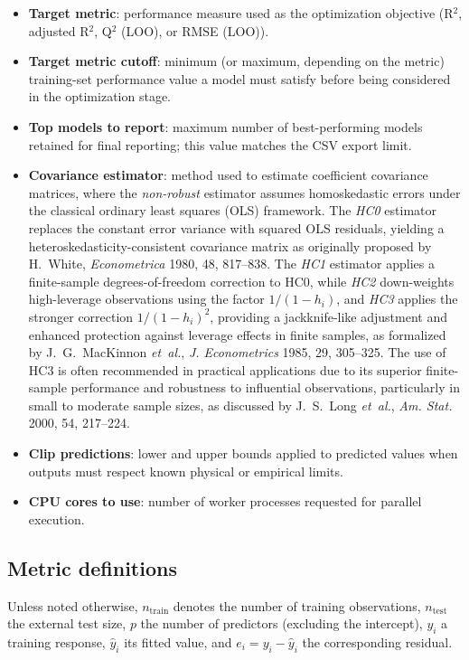 \documentclass[11pt,a4paper]{article}
\begin{document}
\begin{itemize}
  \item \textbf{Target metric}: performance measure used as the optimization objective (R$^2$, adjusted R$^2$, Q$^2$ (LOO), or RMSE (LOO)).
  \item \textbf{Target metric cutoff}: minimum (or maximum, depending on the metric) training-set performance value a model must satisfy before being considered in the optimization stage.
  \item \textbf{Top models to report}: maximum number of best-performing models retained for final reporting; this value matches the CSV export limit.
  \item \textbf{Covariance estimator}: method used to estimate coefficient covariance matrices, where the \emph{non-robust} estimator assumes homoskedastic errors under the classical ordinary least squares (OLS) framework. The \emph{HC0} estimator replaces the constant error variance with squared OLS residuals, yielding a heteroskedasticity-consistent covariance matrix as originally proposed by H.~White, \emph{Econometrica} 1980, 48, 817--838. The \emph{HC1} estimator applies a finite-sample degrees-of-freedom correction to HC0, while \emph{HC2} down-weights high-leverage observations using the factor $1/(1-h_i)$, and \emph{HC3} applies the stronger correction $1/(1-h_i)^2$, providing a jackknife-like adjustment and enhanced protection against leverage effects in finite samples, as formalized by J.~G.~MacKinnon \emph{et~al.}, \emph{J. Econometrics} 1985, 29, 305--325. The use of HC3 is often recommended in practical applications due to its superior finite-sample performance and robustness to influential observations, particularly in small to moderate sample sizes, as discussed by J.~S.~Long \emph{et~al.}, \emph{Am. Stat.} 2000, 54, 217--224.
  \item \textbf{Clip predictions}: lower and upper bounds applied to predicted values when outputs must respect known physical or empirical limits.
  \item \textbf{CPU cores to use}: number of worker processes requested for parallel execution.
\end{itemize}

\subsection{Metric definitions}

Unless noted otherwise, $n_{\mathrm{train}}$ denotes the number of training observations, $n_{\mathrm{test}}$ the external test size, $p$ the number of predictors (excluding the intercept), $y_i$ a training response, $\hat{y}_i$ its fitted value, and $e_i = y_i - \hat{y}_i$ the corresponding residual.
\end{document}
